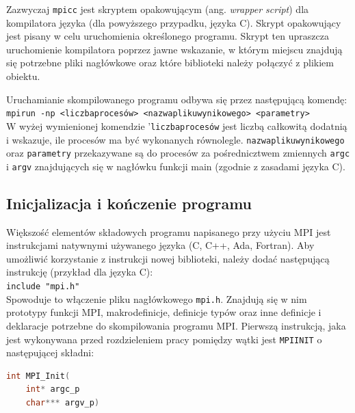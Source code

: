 Zazwyczaj \texttt{mpicc} jest skryptem opakowującym (ang. \textit{wrapper script}) dla kompilatora języka (dla powyższego przypadku, języka C). Skrypt opakowujący jest pisany w celu uruchomienia określonego programu. Skrypt ten upraszcza uruchomienie kompilatora poprzez jawne wskazanie, w którym miejscu znajdują się potrzebne pliki nagłówkowe oraz które biblioteki należy połączyć z plikiem obiektu.

Uruchamianie skompilowanego programu odbywa się przez następującą komendę: \\

\texttt{mpirun -np <liczba\textunderscore procesów> <nazwa\textunderscore pliku\textunderscore wynikowego> <parametry>} \\

W wyżej wymienionej komendzie '\texttt{liczba\textunderscore procesów} jest liczbą całkowitą dodatnią i wskazuje, ile procesów ma być wykonanych równolegle. \texttt{nazwa\textunderscore pliku\textunderscore wynikowego} oraz \texttt{parametry} przekazywane są do procesów za pośrednicztwem zmiennych \texttt{argc} i \texttt{argv} znajdujących się w nagłówku funkcji main (zgodnie z zasadami języka C).


\subsection{Inicjalizacja i kończenie programu}

Większość elementów składowych programu napisanego przy użyciu MPI jest instrukcjami natywnymi używanego języka (C, C++, Ada, Fortran). Aby umożliwić korzystanie z instrukcji nowej biblioteki, należy dodać następującą instrukcję (przykład dla języka C): \\

\texttt{include "mpi.h"} \\

Spowoduje to włączenie pliku nagłówkowego \texttt{mpi.h}. Znajdują się w nim prototypy funkcji MPI, makrodefinicje, definicje typów oraz inne  definicje i deklaracje potrzebne do skompilowania programu MPI. Pierwszą instrukcją, jaka jest wykonywana przed rozdzieleniem pracy pomiędzy wątki jest \texttt{MPI\textunderscore INIT} o następującej składni: \\

\begin{lstlisting}[language=C]
int MPI_Init(
	int* argc_p 
	char*** argv_p)
\end{lstlisting} 

